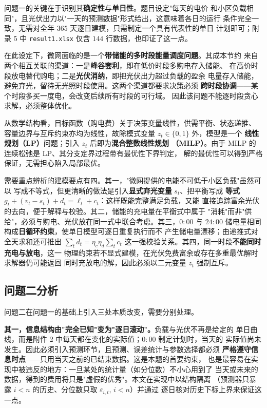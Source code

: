 \documentclass[withoutpreface,bwprint]{cumcmthesis}
\begin{document}
问题一的关键在于识别其\textbf{确定性}与\textbf{单日性}。题目设定"每天的电价
和小区负载相同"，且光伏出力以"一天的预测数据"形式给出，这意味着各日的运行
条件完全一致，无需对全年 $365$ 天逐日建模，只需制定一个具有代表性的单日
计划即可；附录 5 中 \texttt{result1.xlsx} 仅含 $144$ 行数据，也印证了这一点。

在此设定下，微网面临的是一个\textbf{带储能的多时段能量调度问题}。其成本节约
来自两个相互关联的渠道：一是\textbf{峰谷套利}，即在低价时段多购电存入储能、
在高价时段放电替代购电；二是\textbf{光伏消纳}，即把光伏出力超过负载的盈余
电量存入储能，避免弃光，留待无光照时段使用。这两个渠道都要求决策必须
\textbf{跨时段协调}——某个时段多买一度电，会改变后续所有时段的可行域。
因此该问题不能逐时段贪心求解，必须整体优化。

从数学结构看，目标函数（购电费）关于决策变量线性，供需平衡、状态递推、
容量边界与互斥约束亦均为线性，故除模式变量 $z_t \in \{0,1\}$ 外，模型是一个
\textbf{线性规划（LP）}问题；引入 $z_t$ 后即为\textbf{混合整数线性规划
（MILP）}。由于 MILP 的连续松弛是 LP、其分支定界过程带有最优性下界判定，
解的最优性可以得到严格保证，无需担心陷入局部最优。

需要重点辨析的建模要点有四。其一，"微网提供的电能不可低于小区负载"虽然可以
写成不等式，但更清晰的做法是引入\textbf{显式弃光变量} $s_t$、把平衡写成
\textbf{等式} $g_t+(v_t-s_t)+d_t=\ell_t+c_t$：这样既能完整满足负载，又能
直接追踪富余光伏的去向，便于解释与校验。其二，储能的充电量在平衡式中属于
"消耗"而非"供给"，必须与购电、光伏放在同一式中联合考虑。其三，$0{:}00$ 与
$24{:}00$ 储电量相同构成\textbf{日循环约束}，使单日模型可逐日重复执行而不
产生储电量漂移；由递推式对全天求和还可推出 $\sum_t d_t = \eta_c\eta_d
\sum_t c_t$ 这一强校验关系。其四，同一时段\textbf{不能同时充电与放电}，这一
物理约束若不显式建模，在光伏免费富余或存在多重最优解时求解器仍可能返回
同时充放电的解，因此必须以二元变量 $z_t$ 强制互斥。

\subsection{问题二分析}

问题二在问题一的基础上引入三处本质改变，需要分别处理。

\textbf{其一，信息结构由"完全已知"变为"逐日滚动"。}负载与光伏不再是给定的
单日曲线，而是附件 2 中每天都在变化的实际值；$0{:}00$ 制定计划时，当天的
实际值尚未发生。因此必须引入预测环节，且预测、误差统计与参数选择都必须
\textbf{严格遵守信息时点}——只用当天之前的已结束数据。这是本题的首要约束，
也是最容易在实现中被违反的地方：一旦某处的统计量（如分位数）不小心用到了
当天或未来的数据，得到的费用将只是"虚假的优秀"。本文在实现中以结构隔离
（预测器只暴露 $i<n$ 的历史、分位数只取 $\varepsilon_{i,t},\,i<n$）并通过
逐日核对历史下标上界来保证这一点。
\end{document}
